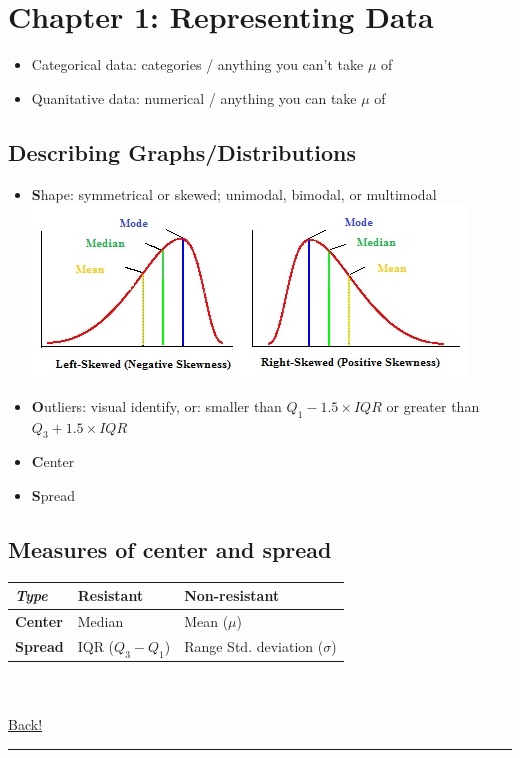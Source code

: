 \documentclass[main]{subfiles}
\begin{document}
\section{Chapter 1: Representing Data}

\begin{itemize}
    \item Categorical data: categories / anything you can't take $\mu$ of
    \item Quanitative data: numerical / anything you can take $\mu$ of
\end{itemize}

\subsection{Describing Graphs/Distributions}
\begin{itemize}
    \item \textbf{S}hape: symmetrical or skewed; unimodal, bimodal, or multimodal
        \subitem \includegraphics[scale=0.7]{skewed_distribution}
    \item \textbf{O}utliers: visual identify, or: smaller than $Q_1 - 1.5 \times IQR$ or greater than $Q_3 + 1.5 \times IQR$
    \item \textbf{C}enter
    \item \textbf{S}pread
\end{itemize}

\subsection{Measures of center and spread}
\begin{tabular}{ | p{3cm} || p{3cm} | p{3cm} | }
    \hline
    \textbf{\textit{Type}} & \textbf{Resistant} & \textbf{Non-resistant} \\
    \hline
    \textbf{Center} & Median & Mean ($\mu$)\\
    \hline
    \textbf{Spread} & IQR ($Q_3 - Q_1$) & Range \newline Std. deviation ($\sigma$) \\
    \hline
\end{tabular}
\\~\\
\noindent\hyperlink{toc}{Back!}
\newline\hrule
\end{document}
